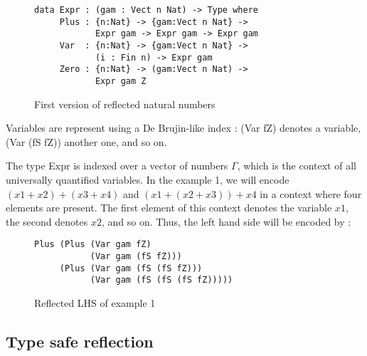 \begin{figure}[H]
\figrule
\begin{center}
\begin{verbatim}
data Expr : (gam : Vect n Nat) -> Type where
     Plus : {n:Nat} -> {gam:Vect n Nat} -> 
            Expr gam -> Expr gam -> Expr gam
     Var  : {n:Nat} -> {gam:Vect n Nat} -> 
            (i : Fin n) -> Expr gam
     Zero : {n:Nat} -> (gam:Vect n Nat) -> 
            Expr gam Z
\end{verbatim}
\end{center}
\caption{First version of reflected natural numbers}
\figrule
\end{figure}


Variables are represent using a De Brujin-like index : (Var fZ) denotes a variable, (Var (fS fZ)) another one, and so on.

The type Expr is indexed over a vector of numbers $\Gamma$, which is the context of all universally quantified variables. In the example 1, we will encode $(x1 + x2) + (x3 + x4)$ and $(x1 + (x2 + x3)) + x4$ in a context where four elements are present. The first element of this context denotes the variable $x1$, the second denotes $x2$, and so on.
Thus, the left hand side will be encoded by :

\begin{figure}[H]
\figrule
\begin{center}
\begin{verbatim}
Plus (Plus (Var gam fZ) 
           (Var gam (fS fZ))) 
     (Plus (Var gam (fS (fS fZ))) 
           (Var gam (fS (fS (fS fZ)))))
\end{verbatim}
\end{center}
\caption{Reflected LHS of example 1}
\figrule
\end{figure}

\subsection{Type safe reflection}

